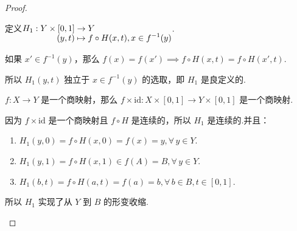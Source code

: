 \begin{proof}
    \vspace{-2 em}
    \begin{center}
    \end{center}\par
    定义$\setjot[-2]\begin{aligned}[t]
        H_1: Y \times [0,1] &\to Y \\
        (y, t) &\mapsto f \circ H(x, t), x \in f^{-1}(y)
    \end{aligned} $.\par
    如果 $x' \in f^{-1}(y)$，那么 $f(x) = f(x') \implies f \circ H(x, t) = f \circ H(x', t)$.\par
    所以 $H_1(y, t)$ 独立于 $x \in f^{-1}(y)$ 的选取，即 $H_1$ 是良定义的.
    \begin{lemma}[][lem:10.13]
        $f: X \to Y$ 是一个商映射，那么 $f \times \mathrm{id}: X \times [0,1] \to Y \times [0,1]$ 是一个商映射.
    \end{lemma}
    因为 $f \times \mathrm{id}$ 是一个商映射且 $f \circ H$ 是连续的，所以 $H_1$ 是连续的.并且：
    \begin{enumerate}[(1)]
        \item $H_1(y, 0) = f \circ H(x, 0) = f(x) = y, \forall\, y \in Y$.
        \item $H_1(y, 1) = f \circ H(x, 1) \in f(A) = B, \forall\, y \in Y$.
        \item $H_1(b, t) = f \circ H(a, t) = f(a) = b, \forall\, b \in B, t \in [0,1]$.
    \end{enumerate}
    
    所以 $H_1$ 实现了从 $Y$ 到 $B$ 的形变收缩. \par
    \vspace{-1 em}
    \begin{center}
    \end{center}
\end{proof}


